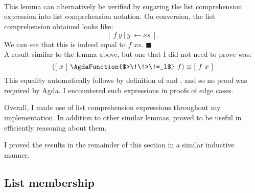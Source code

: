 \documentclass[12pt,a4paper,twoside,openright]{report}
\newcommand{\F}{\AgdaFunction}
\begin{document}
\begin{code}
\> \AgdaSymbol{:} \>[16]\AgdaSymbol{\{}  \AgdaSymbol{:} \AgdaSymbol{\}}  \AgdaSymbol{(} \AgdaSymbol{:}  \AgdaSymbol{)}  \AgdaSymbol{(} \AgdaSymbol{:}   \AgdaSymbol{)} \<%
\\
\>[2]\<[16]%
\>[16]     \AgdaFunction{[}   \AgdaFunction{]}\AgdaSymbol{)}    \<%
\\
\> \AgdaInductiveConstructor{[]}  \AgdaSymbol{=} \<%
\\
\> \AgdaSymbol{(}  \AgdaSymbol{)}  \AgdaSymbol{=}  \AgdaSymbol{(} \AgdaSymbol{(} \AgdaSymbol{))} \AgdaSymbol{(}  \AgdaSymbol{)}\<%
\end{code}

This lemma can alternatively be verified by sugaring the list comprehension expression into list comprehension notation. On conversion, the list comprehension obtained looks like:
$$[\ f\ y\ |\ y\ \leftarrow xs\ ].$$
We can see that this is indeed equal to \F{map} $f$ $xs$.
\hfill{$\blacksquare$}\\

A result similar to the lemma above, but one that I did not need to prove was:
$$([\ x\ ]\ \F{$>\!\!>\!=_l$}\ f) \equiv [\ f\ x\ ]$$
This equality automatically follows by definition of \F{concat} and \F{map}, and so no proof was required by Agda. I encountered such expressions in proofs of edge cases.

Overall, I made use of list comprehension expressions throughout my implementation. In addition to other similar lemmas, \F{>\!\!>\!=$_l$-map} proved to be useful in efficiently reasoning about them. 

I proved the results in the remainder of this section in a similar inductive manner.

\subsection{List membership} \label{member}
\end{document}
